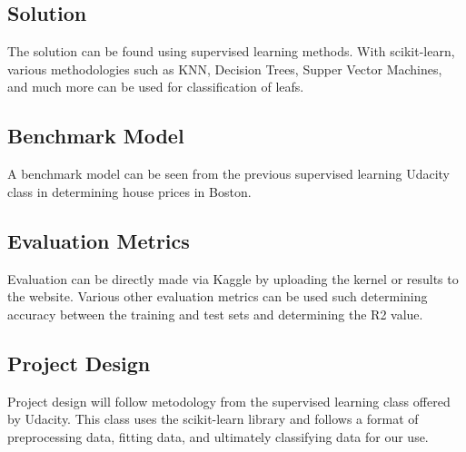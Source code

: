 \documentclass{article}
\begin{document}
\subsection{Solution}
The solution can be found using supervised learning methods. With scikit-learn, various methodologies such as KNN, Decision Trees, Supper Vector Machines, and much more can be used for classification of leafs.

\subsection{Benchmark Model}
A benchmark model can be seen from the previous supervised learning Udacity class in determining house prices in Boston.

\subsection{Evaluation Metrics}
Evaluation can be directly made via Kaggle by uploading the kernel or results to the website. Various other evaluation metrics can be used such determining accuracy between the training and test sets and determining the R2 value.

\subsection{Project Design}
Project design will follow metodology from the supervised learning class offered by Udacity. This class uses the scikit-learn library and follows a format of preprocessing data, fitting data, and ultimately classifying data for our use.
\end{document}
